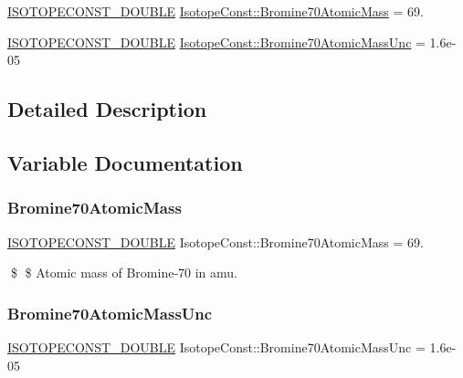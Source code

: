 \begin{DoxyCompactItemize}
\item 
\mbox{\hyperlink{group___isotope_const-_macros_ga8f45a7272ce02c0b4c65c44636ed719a}{I\+S\+O\+T\+O\+P\+E\+C\+O\+N\+S\+T\+\_\+\+D\+O\+U\+B\+LE}} \mbox{\hyperlink{group___isotope_const-_bromine-_br70_gaa35a2163663400ea11f20bf52575e421}{Isotope\+Const\+::\+Bromine70\+Atomic\+Mass}} = 69.
\item 
\mbox{\hyperlink{group___isotope_const-_macros_ga8f45a7272ce02c0b4c65c44636ed719a}{I\+S\+O\+T\+O\+P\+E\+C\+O\+N\+S\+T\+\_\+\+D\+O\+U\+B\+LE}} \mbox{\hyperlink{group___isotope_const-_bromine-_br70_ga6bd4c15fce6ca35c9ce5ae7961982535}{Isotope\+Const\+::\+Bromine70\+Atomic\+Mass\+Unc}} = 1.\+6e-\/05
\end{DoxyCompactItemize}


\subsection{Detailed Description}


\subsection{Variable Documentation}
\mbox{\label{group___isotope_const-_bromine-_br70_gaa35a2163663400ea11f20bf52575e421}} 
\subsubsection{\texorpdfstring{Bromine70\+Atomic\+Mass}{Bromine70AtomicMass}}
{\footnotesize\ttfamily \mbox{\hyperlink{group___isotope_const-_macros_ga8f45a7272ce02c0b4c65c44636ed719a}{I\+S\+O\+T\+O\+P\+E\+C\+O\+N\+S\+T\+\_\+\+D\+O\+U\+B\+LE}} Isotope\+Const\+::\+Bromine70\+Atomic\+Mass = 69.}

\$ \$ Atomic mass of Bromine-\/70 in amu. \mbox{\label{group___isotope_const-_bromine-_br70_ga6bd4c15fce6ca35c9ce5ae7961982535}} 
\subsubsection{\texorpdfstring{Bromine70\+Atomic\+Mass\+Unc}{Bromine70AtomicMassUnc}}
{\footnotesize\ttfamily \mbox{\hyperlink{group___isotope_const-_macros_ga8f45a7272ce02c0b4c65c44636ed719a}{I\+S\+O\+T\+O\+P\+E\+C\+O\+N\+S\+T\+\_\+\+D\+O\+U\+B\+LE}} Isotope\+Const\+::\+Bromine70\+Atomic\+Mass\+Unc = 1.\+6e-\/05}

